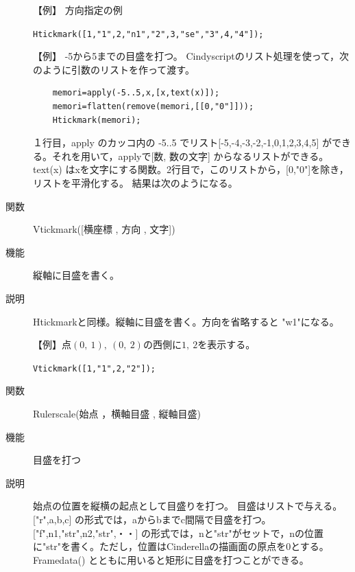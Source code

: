 \documentclass[papersize,a4paper,12pt,uplatex]{jsarticle}
\begin{document}
\begin{description}
\vspace{\baselineskip}
【例】 方向指定の例

\hspace{10mm} \verb|Htickmark([1,"1",2,"n1","2",3,"se","3",4,"4"]);|

\vspace{\baselineskip}
\begin{center}

\end{center}

【例】  -5から5までの目盛を打つ。
  Cindyscriptのリスト処理を使って，次のように引数のリストを作って渡す。
\begin{verbatim}
    memori=apply(-5..5,x,[x,text(x)]);
    memori=flatten(remove(memori,[[0,"0"]]));
    Htickmark(memori);
\end{verbatim}
１行目，apply のカッコ内の -5..5 でリスト[-5,-4,-3,-2,-1,0,1,2,3,4,5] ができる。それを用いて，applyで[数, 数の文字] からなるリストができる。text(x) はxを文字にする関数。2行目で，このリストから，[0,"0"]を除き，リストを平滑化する。 結果は次のようになる。

\begin{center} \scalebox{0.9}{}\end{center}

\hypertarget{vtickmark}{}
\item[関数]  Vtickmark([横座標 , 方向 , 文字])
\item[機能]  縦軸に目盛を書く。
\item[説明]  Htickmarkと同様。縦軸に目盛を書く。方向を省略すると "w1"になる。

\vspace{\baselineskip}
【例】点$(0,\ 1),\ (0,\ 2)$の西側に$1,\ 2$を表示する。

\hspace{10mm}  \verb|Vtickmark([1,"1",2,"2"]);|

\vspace{\baselineskip}
\hypertarget{rulerscale}{}
\item[関数]  Rulerscale(始点 ，横軸目盛 , 縦軸目盛)
\item[機能]  目盛を打つ
\item[説明]  始点の位置を縦横の起点として目盛りを打つ。
  目盛はリストで与える。
  ["r",a,b,c]  の形式では，aからbまでc間隔で目盛を打つ。
  ["f",n1,"str",n2,"str",・・] の形式では，nと"str"がセットで，nの位置に"str"を書く。ただし，位置はCinderellaの描画面の原点を0とする。
  Framedata() とともに用いると矩形に目盛を打つことができる。
  

\end{description}
\end{document}
